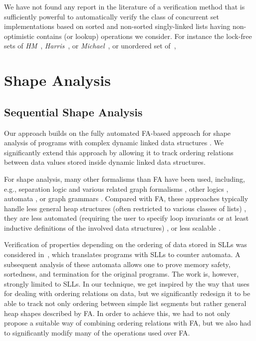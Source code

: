 We have not found any report in the literature of a
verification method that is sufficiently powerful to
automatically verify the class of concurrent set
implementations based on sorted and non-sorted
singly-linked lists having non-optimistic contains (or lookup) operations we consider. For instance %
the lock-free sets of {\it HM}~\cite{ArtOfMpP},
{\it Harris}~\cite{Harris:list}, or {\it Michael}~\cite{Michael:list},
or unordered set of~\cite{Zhang:unorderedlist},


\section{Shape Analysis}
\subsection{Sequential Shape Analysis}
Our approach builds on the fully automated FA-based
approach for shape analysis of programs with complex dynamic linked data
structures \cite{forester11,Forester}. We significantly extend this approach by
allowing it to track ordering relations between data values stored inside
dynamic linked data structures. 

For shape analysis, many other formalisms than FA have been used, including,
e.g., separation logic and various related graph formalisms
\cite{Hongseok:SL,thor10,rival11,Kamil:SL}, other logics \cite{SagivRW02,Jakob:ML},
automata \cite{artmc12}, or graph grammars \cite{Jonathan:Shape}. Compared with FA,
these approaches typically handle less general heap structures (often restricted
to various classes of lists) \cite{Hongseok:SL,Kamil:SL}, they are less
automated (requiring the user to specify loop invariants or at least inductive
definitions of the involved data structures)
\cite{thor10,rival11,Kamil:SL,Jonathan:Shape}, or less scalable \cite{artmc12}.

Verification of properties depending on the ordering of data stored in SLLs was
considered in~\cite{lists-counters}, which translates programs with SLLs to
counter automata. A subsequent analysis of these automata allows one to prove
memory safety, sortedness, and termination for the original programs. The work
is, however, strongly limited to SLLs. In our technique, we get inspired by the way
that \cite{lists-counters} uses for dealing with ordering relations on data, but
we significantly redesign it to be able to track not only ordering between
simple list segments but rather general heap shapes described by FA. In order to
achieve this, we had to not only propose a suitable way of combining ordering
relations with FA, but we also had to significantly modify many of the
operations used over FA.

